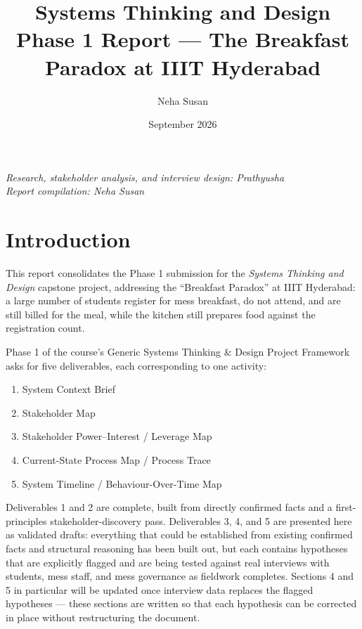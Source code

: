 \documentclass[11pt]{article}
\title{Systems Thinking and Design \\ \large Phase 1 Report --- The Breakfast Paradox at IIIT Hyderabad}
\author{Neha Susan}
\date{September 2026}
\begin{document}
\maketitle

\begin{center}
\textit{Research, stakeholder analysis, and interview design: Prathyusha \\
Report compilation: Neha Susan}
\end{center}

\vspace{1em}

\tableofcontents
\newpage

\section{Introduction}

This report consolidates the Phase 1 submission for the \emph{Systems Thinking and
Design} capstone project, addressing the ``Breakfast Paradox'' at IIIT Hyderabad: a
large number of students register for mess breakfast, do not attend, and are still
billed for the meal, while the kitchen still prepares food against the registration
count.

Phase 1 of the course's Generic Systems Thinking \& Design Project Framework asks for
five deliverables, each corresponding to one activity:

\begin{enumerate}[label=\arabic*.]
    \item System Context Brief
    \item Stakeholder Map
    \item Stakeholder Power--Interest / Leverage Map
    \item Current-State Process Map / Process Trace
    \item System Timeline / Behaviour-Over-Time Map
\end{enumerate}

Deliverables 1 and 2 are complete, built from directly confirmed facts and a
first-principles stakeholder-discovery pass. Deliverables 3, 4, and 5 are presented
here as validated drafts: everything that could be established from existing
confirmed facts and structural reasoning has been built out, but each contains
hypotheses that are explicitly flagged and are being tested against real interviews
with students, mess staff, and mess governance as fieldwork completes. Sections 4 and
5 in particular will be updated once interview data replaces the flagged
hypotheses --- these sections are written so that each hypothesis can be corrected in
place without restructuring the document.
\end{document}
